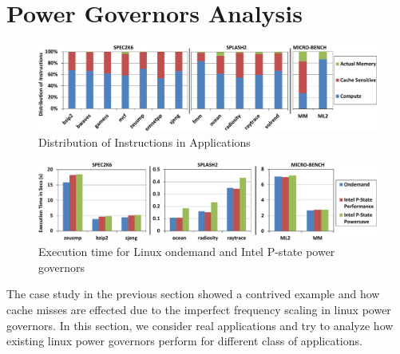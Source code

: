 \section{Power Governors Analysis}\label{sec:appl}

\begin{figure}[htp]
  \begin{center}
\includegraphics[width=\linewidth]{figs/app-cat-crop.pdf}
  \end{center}
  \vspace{-0.1in}
  \caption{Distribution of Instructions in Applications}
  \label{fig:app-cat}
\end{figure}

\begin{figure}[htp]
  \begin{center}
\includegraphics[width=\linewidth]{figs/def-exec-time-crop.pdf}
  \end{center}
  \vspace{-0.1in}
  \caption{Execution time for Linux ondemand and Intel P-state power governors}
  \label{fig:def-perf}
\end{figure}

The case study in the previous section showed a contrived example and how cache misses are effected 
due to the imperfect frequency scaling in linux power governors.
In this section, we consider real applications and try to analyze how existing linux power
governors perform for different class of applications.

